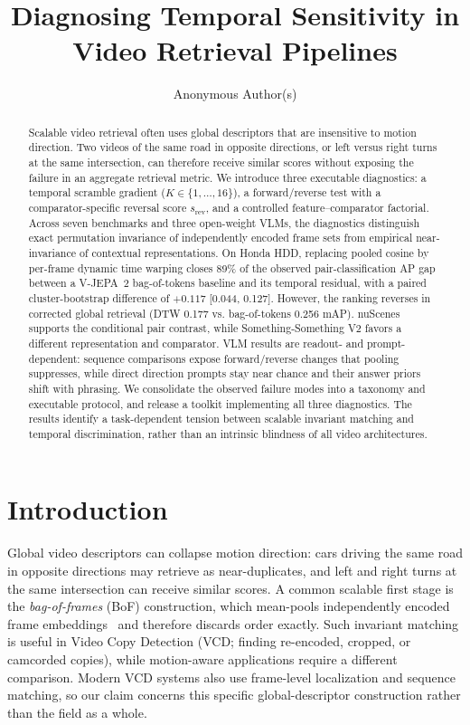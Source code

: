 \documentclass{article}
\title{Diagnosing Temporal Sensitivity in Video Retrieval Pipelines}
\author{Anonymous Author(s)}
\theoremstyle{remark}
\begin{document}
\maketitle

\begin{abstract}
Scalable video retrieval often uses global descriptors that are insensitive to motion
direction. Two videos of the same road in opposite directions, or left versus right turns
at the same intersection, can therefore receive similar scores without exposing the
failure in an aggregate retrieval metric. We introduce three executable diagnostics: a
temporal scramble gradient ($K\!\in\!\{1,\ldots,16\}$), a forward/reverse test with a
comparator-specific reversal score $s_\text{rev}$, and a controlled feature--comparator
factorial. Across seven benchmarks and three open-weight VLMs, the diagnostics distinguish
exact permutation invariance of independently encoded frame sets from empirical
near-invariance of contextual representations. On Honda HDD, replacing pooled cosine by
per-frame dynamic time warping closes 89\% of the observed pair-classification AP gap between a
V-JEPA~2 bag-of-tokens baseline and its temporal residual, with a paired cluster-bootstrap
difference of $+0.117$ [0.044, 0.127]. However, the ranking reverses in corrected global
retrieval (DTW 0.177 vs. bag-of-tokens 0.256 mAP). nuScenes supports the conditional pair
contrast, while Something-Something V2 favors a different representation and comparator.
VLM results are readout- and prompt-dependent: sequence comparisons expose
forward/reverse changes that pooling suppresses, while direct direction prompts stay near
chance and their answer priors shift with phrasing. We consolidate the observed failure
modes into a taxonomy and executable protocol, and release a toolkit implementing all
three diagnostics. The results identify a task-dependent tension between scalable
invariant matching and temporal discrimination, rather than an intrinsic blindness of
all video architectures.
\end{abstract}

\section{Introduction}

Global video descriptors can collapse motion direction: cars driving the same road in opposite directions may retrieve as near-duplicates, and left and right turns at the same intersection can receive similar scores. A common scalable first stage is the \emph{bag-of-frames} (BoF) construction, which mean-pools independently encoded frame embeddings~\cite{faiss, semdedup} and therefore discards order exactly. Such invariant matching is useful in Video Copy Detection (VCD; finding re-encoded, cropped, or camcorded copies), while motion-aware applications require a different comparison. Modern VCD systems also use frame-level localization and sequence matching, so our claim concerns this specific global-descriptor construction rather than the field as a whole.
\end{document}
